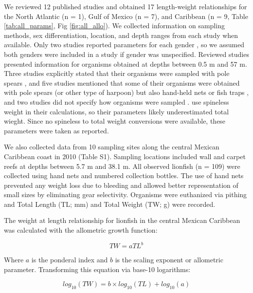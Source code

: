 \documentclass[]{article}
\theoremstyle{definition}
\theoremstyle{definition}
\theoremstyle{definition}
\theoremstyle{remark}
\begin{document}
We reviewed 12 published studies and obtained 17 length-weight
relationships for the North Atlantic (n = 1), Gulf of Mexico (n = 7),
and Caribbean (n = 9, Table \ref{tab:all_params}, Fig
\ref{fig:all_allo}). We collected information on sampling methods, sex
differentiation, location, and depth ranges from each study when
available. Only two studies reported parameters for each gender
\citep{aguilarperera_2016,fogg_2013}, so we assumed both genders were
included in a study if gender was unspecified. Reviewed studies
presented information for organisms obtained at depths between 0.5 m and
57 m. Three studies explicitly stated that their organisms were sampled
with pole spears
\citep{dahl_2014,aguilarperera_2016,chin_2016,sabidoitz_2016}, and five
studies mentioned that some of their organisms were obtained with pole
spears (or other type of harpoon) but also hand-held nets or fish traps
\citep{barbour_2011,fogg_2013,edwards_2014,toledohernndez_2014,sandel_2015,sabidoitza_2016,sabidoitz_2016},
and two studies did not specify how organisms were sampled
\citep{darling_2011,deleon_2013}. \citet{fogg_2013} use spineless weight
in their calculations, so their parameters likely underestimated total
wieght. Since no spineless to total weight conversions were available,
these parameters were taken as reported.

We also collected data from 10 sampling sites along the central Mexican
Caribbean coast in 2010 (Table S1). Sampling locations included wall and
carpet reefs at depths between 5.7 m and 38.1 m. All observed lionfish
(n = 109) were collected using hand nets and numbered collection
bottles. The use of hand nets prevented any weight loss due to bleeding
and allowed better representation of small sizes by eliminating gear
selectivity. Organisms were euthanized via pithing and Total Length (TL;
mm) and Total Weight (TW; g) were recorded.

The weight at length relationship for lionfish in the central Mexican
Caribbean was calculated with the allometric growth function:

\begin{equation}
\label{eq:allometric}
TW = aTL^b
\end{equation}

Where \(a\) is the ponderal index and \(b\) is the scaling exponent or
allometric parameter. Transforming this equation via base-10 logarithms:

\begin{equation}
\label{eq:log-alo}
log_{10}(TW) = b\times log_{10}(TL) + log_{10}(a)
\end{equation}
\end{document}
